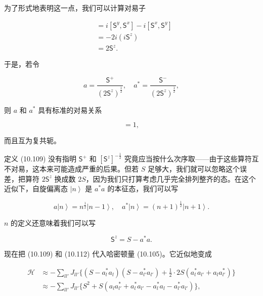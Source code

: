 为了形式地表明这一点，我们可以计算对易子

\begin{align*}
[\mathsf{S}^{+},\mathsf{S}^{-}] &= i[\mathsf{S}^{y},\mathsf{S}^{x}] - i[\mathsf{S}^{x},\mathsf{S}^{y}]\\
&= -2i(i\mathsf{S}^z)\\
&= 2\mathsf{S}^z.
\tag{10.108}
\end{align*}

于是，若令

\begin{equation*}
a = \frac{\mathsf{S}^{+}}{(2\mathsf{S}^z)^{\frac{1}{2}}}, \quad a^{*} = \frac{\mathsf{S}^{-}}{(2\mathsf{S}^z)^{\frac{1}{2}}},
\tag{10.109}
\end{equation*}

则 $a$ 和 $a^{*}$ 具有标准的对易关系

\begin{equation*}
[a, a^{*}] = 1,
\tag{10.110}
\end{equation*}

而且互为复共轭。

定义 (10.109) 没有指明 $\mathsf{S}^{+}$ 和 $[\mathsf{S}^z]^{-\frac{1}{2}}$ 究竟应当按什么次序取——由于这些算符互不对易，这本来可能造成严重的后果。但若 $S$ 足够大，我们就可以忽略这个误差，把算符 $2\mathsf{S}^z$ 换成数 $2S$，因为我们只打算考虑几乎完全排列整齐的态。在这个近似下，自旋偏离态 $\left|n\right\rangle$ 是 $a^{*}a$ 的本征态，我们可以写

\begin{equation*}
a\left|n\right\rangle = n^{\frac{1}{2}}\left|n-1\right\rangle, \quad a^{*}\left|n\right\rangle = (n+1)^{\frac{1}{2}}\left|n+1\right\rangle.
\tag{10.111}
\end{equation*}

$n$ 的定义还意味着我们可以写

\begin{equation*}
\mathsf{S}^z = S - a^{*}a.
\tag{10.112}
\end{equation*}

现在把 (10.109) 和 (10.112) 代入哈密顿量 (10.105)。它近似地变成

\begin{align*}
\mathcal{H} &\approx -\sum_{ll'} J_{ll'}\{(S-a_l^{*}a_l)(S-a_{l'}^{*}a_{l'})+\tfrac{1}{2}\cdot 2S(a_l^{*}a_{l'}+a_l a_{l'}^{*})\}\\
&\approx -\sum_{ll'} J_{ll'}\{S^2 + S(a_l a_{l'}^{*}+a_l^{*}a_{l'}-a_l^{*}a_l-a_{l'}^{*}a_{l'})\},
\tag{10.113}
\end{align*}

